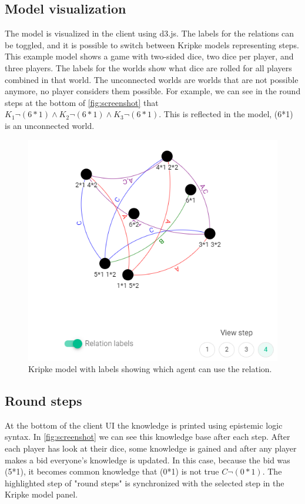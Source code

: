 \documentclass{article}
\begin{document}
\subsection*{Model visualization} %
The model is visualized in the client using d3.js. The labels for the relations can be toggled, and it is possible to switch between Kripke models representing steps. This example model shows a game with two-sided dice, two dice per player, and three players. The labels for the worlds show what dice are rolled for all players combined in that world. The unconnected worlds are worlds that are not possible anymore, no player considers them possible. For example, we can see in the round steps at the bottom of \autoref{fig:screenshot} that $K_1 \neg (6*1) \land K_2 \neg (6*1) \land K_3 \neg (6*1)$. This is reflected in the model, (6*1) is an unconnected world.

\begin{figure}[h]
    \includegraphics[width=.5\textwidth]{img/withrelations.png}
    \centering
    \caption{Kripke model with labels showing which agent can use the relation.}
    \label{fig:screenshot}
\end{figure}

\subsection*{Round steps}
At the bottom of the client UI the knowledge is printed using epistemic logic syntax. In \autoref{fig:screenshot} we can see this knowledge base after each step. After each player has look at their dice, some knowledge is gained and after any player makes a bid everyone's knowledge is updated. In this case, because the bid was (5*1), it becomes common knowledge that (0*1) is not true $C \neg(0*1)$. The highlighted step of "round steps" is synchronized with the selected step in the Kripke model panel.
\end{document}
